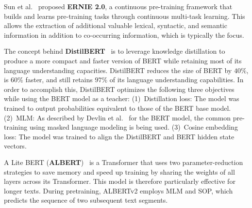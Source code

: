 \documentclass[runningheads]{llncs}
\begin{document}
Sun et al.~\cite{ERNIE} proposed \textbf{ERNIE 2.0}, a continuous pre-training framework that builds and learns pre-training tasks through continuous multi-task learning. 
This allows the extraction of additional valuable lexical, syntactic, and semantic information in addition to co-occurring information, which is typically the focus.

The concept behind \textbf{DistilBERT}~\cite{DISTILBERT} is to leverage knowledge distillation to produce a more compact and faster version of BERT while retaining most of its language understanding capacities. DistilBERT reduces the size of BERT by $40\%$, is $60\%$ faster, and still retains $97\%$ of its language understanding capabilities.
In order to accomplish this, DistilBERT optimizes the following three objectives while using the BERT model as a teacher:
(1)~Distillation loss:
    The model was trained to output probabilities equivalent to those of the BERT base model. 
(2)~\acf{MLM}:
    As described by Devlin et al.~\cite{devlin2018bert} for the BERT model, the common pre-training using masked language modeling is being used.
(3)~Cosine embedding loss: The model was trained to align the DistilBERT and BERT hidden state vectors.

A Lite BERT (\textbf{ALBERT})~\cite{albert2019} is a Transformer that uses two parameter-reduction strategies to save memory and speed up training by sharing the weights of all layers across its Transformer. 
This model is therefore particularly effective for longer texts. 
During pretraining, ALBERTv2 employs \ac{MLM} and \ac{SOP}, which predicts the sequence of two subsequent text segments.
\end{document}
